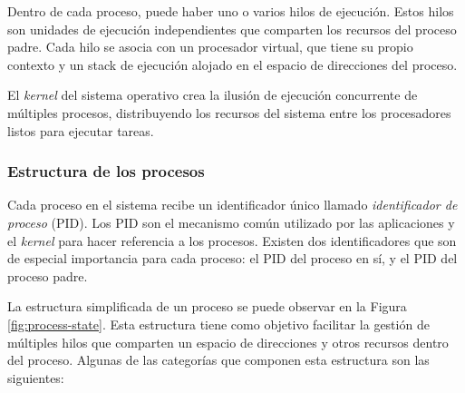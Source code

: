 Dentro de cada proceso, puede haber uno o varios hilos de ejecución. Estos hilos son unidades de ejecución independientes que comparten los recursos del proceso padre. Cada hilo se asocia con un procesador virtual, que tiene su propio contexto y un stack de ejecución alojado en el espacio de direcciones del proceso.\par

El \textit{kernel} del sistema operativo crea la ilusión de ejecución concurrente de múltiples procesos, distribuyendo los recursos del sistema entre los procesadores listos para ejecutar tareas.\par

\subsubsection{Estructura de los procesos}
Cada proceso en el sistema recibe un identificador único llamado \textit{identificador de proceso} (PID). Los PID son el mecanismo común utilizado por las aplicaciones y el \textit{kernel} para hacer referencia a los procesos. Existen dos identificadores que son de especial importancia para cada proceso: el PID del proceso en sí, y el PID del proceso padre.

La estructura simplificada de un proceso se puede observar en la Figura \ref{fig:process-state}. Esta estructura tiene como objetivo facilitar la gestión de múltiples hilos que comparten un espacio de direcciones y otros recursos dentro del proceso. Algunas de las categorías que componen esta estructura son las siguientes:

